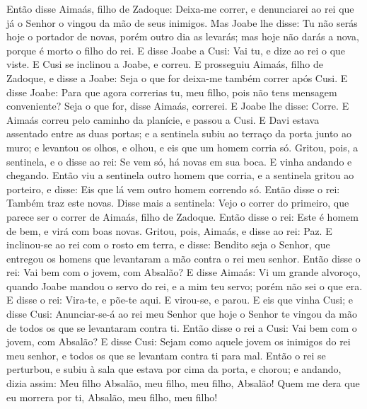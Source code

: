 Então disse Aimaás, filho de Zadoque: Deixa-me correr, e
denunciarei ao rei que já o Senhor o vingou da mão de seus inimigos.
Mas Joabe lhe disse: Tu não serás hoje o portador de novas,
porém outro dia as levarás; mas hoje não darás a nova, porque é
morto o filho do rei. E disse Joabe a Cusi: Vai tu, e dize ao
rei o que viste. E Cusi se inclinou a Joabe, e correu. E
prosseguiu Aimaás, filho de Zadoque, e disse a Joabe: Seja o que for
deixa-me também correr após Cusi. E disse Joabe: Para que agora
correrias tu, meu filho, pois não tens mensagem conveniente?
Seja o que for, disse Aimaás, correrei. E Joabe lhe disse:
Corre. E Aimaás correu pelo caminho da planície, e passou a Cusi.
E Davi estava assentado entre as duas portas; e a sentinela
subiu ao terraço da porta junto ao muro; e levantou os olhos, e
olhou, e eis que um homem corria só. Gritou, pois, a
sentinela, e o disse ao rei: Se vem só, há novas em sua boca. E
vinha andando e chegando. Então viu a sentinela outro homem
que corria, e a sentinela gritou ao porteiro, e disse: Eis que lá
vem outro homem correndo só. Então disse o rei: Também traz este
novas. Disse mais a sentinela: Vejo o correr do primeiro, que
parece ser o correr de Aimaás, filho de Zadoque. Então disse o rei:
Este é homem de bem, e virá com boas novas. Gritou, pois,
Aimaás, e disse ao rei: Paz. E inclinou-se ao rei com o rosto em
terra, e disse: Bendito seja o Senhor, que entregou os homens que
levantaram a mão contra o rei meu senhor. Então disse o rei:
Vai bem com o jovem, com Absalão? E disse Aimaás: Vi um grande
alvoroço, quando Joabe mandou o servo do rei, e a mim teu servo;
porém não sei o que era. E disse o rei: Vira-te, e põe-te
aqui. E virou-se, e parou. E eis que vinha Cusi; e disse
Cusi: Anunciar-se-á ao rei meu Senhor que hoje o Senhor te vingou da
mão de todos os que se levantaram contra ti. Então disse o
rei a Cusi: Vai bem com o jovem, com Absalão? E disse Cusi: Sejam
como aquele jovem os inimigos do rei meu senhor, e todos os que se
levantam contra ti para mal. Então o rei se perturbou, e
subiu à sala que estava por cima da porta, e chorou; e andando,
dizia assim: Meu filho Absalão, meu filho, meu filho, Absalão! Quem
me dera que eu morrera por ti, Absalão, meu filho, meu filho!

\medskip

